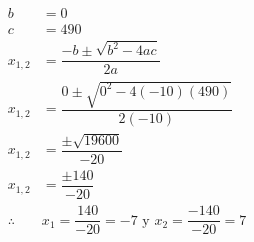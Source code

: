 {\begin{solutionbox}{11cm}
\begin{multicols}{2}
\[\begin{array}{rl}
                    b          & =0                                                            \\
                    c          & =490                                                          \\
                    x_{1,2}    & = \dfrac{-b\pm\sqrt{b^2-4ac}}{2a}                             \\[2em]
                    x_{1,2}    & = \dfrac{0\pm\sqrt{0^2-4(-10)(490)}}{2(-10)}                  \\[2em]
                    x_{1,2}    & = \dfrac{\pm\sqrt{19600}}{-20}                                \\[2em]
                    x_{1,2}    & = \dfrac{\pm140}{-20}                                         \\[2em]
                    \therefore & x_1 =\dfrac{140}{-20}=-7 \text{ y }  x_2 =\dfrac{-140}{-20}=7 \\[2em]
                \end{array}
            \]
        \end{multicols}
    \end{solutionbox}
}